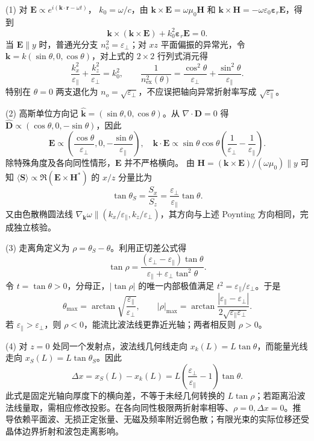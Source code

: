(1) 对 \(\mathbf E\propto e^{i(\mathbf k\cdot\mathbf r-\omega t)}\)，
\(k_0=\omega/c\)，由 \(\mathbf k\times\mathbf E=\omega\mu_0\mathbf H\) 和
\(\mathbf k\times\mathbf H=-\omega\varepsilon_0\boldsymbol\varepsilon_r\mathbf E\)，得到
\[
\mathbf k\times(\mathbf k\times\mathbf E)+k_0^2\boldsymbol\varepsilon_r\mathbf E=0.
\]
当 \(\mathbf E\parallel y\) 时，普通光分支 \(n_o^2=\varepsilon_\perp\)；对 \(xz\) 平面偏振的异常光，令
\(\mathbf k=k(\sin\theta,0,\cos\theta)\)，对上式的 \(2\times2\) 行列式消元得
\[
\frac{k_x^2}{\varepsilon_\parallel}+\frac{k_z^2}{\varepsilon_\perp}=k_0^2,\qquad
\frac1{n_{\mathrm{ex}}^2(\theta)}
=\frac{\cos^2\theta}{\varepsilon_\perp}
+\frac{\sin^2\theta}{\varepsilon_\parallel}.
\]
特别在 \(\theta=0\) 两支退化为 \(n_o=\sqrt{\varepsilon_\perp}\)，不应误把轴向异常折射率写成 \(\sqrt{\varepsilon_\parallel}\)。

(2) 高斯单位方向记 \(\widehat{\mathbf k}=(\sin\theta,0,\cos\theta)\)。从
\(\nabla\cdot\mathbf D=0\) 得
\(\widehat{\mathbf D}\propto(\cos\theta,0,-\sin\theta)\)，因此
\[
\mathbf E\propto
\left(\frac{\cos\theta}{\varepsilon_\perp},0,
-\frac{\sin\theta}{\varepsilon_\parallel}\right),\quad
\mathbf k\cdot\mathbf E\propto
\sin\theta\cos\theta\left(\frac1{\varepsilon_\perp}-\frac1{\varepsilon_\parallel}\right).
\]
除特殊角度及各向同性情形，\(\mathbf E\) 并不严格横向。
由 \(\mathbf H=(\mathbf k\times\mathbf E)/(\omega\mu_0)\parallel y\) 可知
\(\langle\mathbf S\rangle\propto\Re(\mathbf E\times\mathbf H^*)\) 的
\(x/z\) 分量比为
\[
\tan\theta_S=\frac{S_x}{S_z}
=\frac{\varepsilon_\perp}{\varepsilon_\parallel}\tan\theta .
\]
又由色散椭圆法线
\(\nabla_{\mathbf k}\omega\parallel(k_x/\varepsilon_\parallel,k_z/\varepsilon_\perp)\)，其方向与上述 Poynting 方向相同，完成独立核验。

(3) 走离角定义为 \(\rho=\theta_S-\theta\)。利用正切差公式得
\[
\tan\rho=\frac{(\varepsilon_\perp-\varepsilon_\parallel)\tan\theta}
{\varepsilon_\parallel+\varepsilon_\perp\tan^2\theta}.
\]
令 \(t=\tan\theta>0\)，分母正，\(|\tan\rho|\) 的唯一内部极值满足
\(t^2=\varepsilon_\parallel/\varepsilon_\perp\)。于是
\[
\theta_{\max}=\arctan\sqrt{\frac{\varepsilon_\parallel}{\varepsilon_\perp}},\qquad
|\rho|_{\max}=\arctan\frac{|\varepsilon_\parallel-\varepsilon_\perp|}
{2\sqrt{\varepsilon_\parallel\varepsilon_\perp}}.
\]
若 \(\varepsilon_\parallel>\varepsilon_\perp\)，则 \(\rho<0\)，能流比波法线更靠近光轴；两者相反则 \(\rho>0\)。

(4) 对 \(z=0\) 处同一个发射点，波法线几何线走向
\(x_k(L)=L\tan\theta\)，而能量光线走向 \(x_S(L)=L\tan\theta_S\)。因此
\[
\Delta x=x_S(L)-x_k(L)=
L\left(\frac{\varepsilon_\perp}{\varepsilon_\parallel}-1\right)\tan\theta.
\]
此式是固定光轴向厚度下的横向差，不等于未经几何转换的 \(L\tan\rho\)；若距离沿波法线量取，需相应修改投影。在各向同性极限两折射率相等、\(\rho=0,\Delta x=0\)。推导依赖平面波、无损正定张量、无磁及频率附近弱色散；有限光束的实际位移还受晶体边界折射和波包走离影响。

